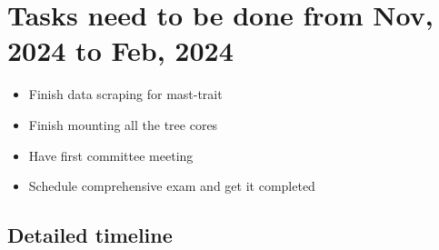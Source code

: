 \documentclass[12pt,letter]{article}
\begin{document}
\section{Tasks need to be done from Nov, 2024 to Feb, 2024}
\begin{itemize}
	\item Finish data scraping for mast-trait
	\item Finish mounting all the tree cores
	\item Have first committee meeting
	\item Schedule comprehensive exam and get it completed
	\end{itemize}	
\begin{multicols}{2}
\section{Detailed timeline}

\end{multicols}
\end{document}
